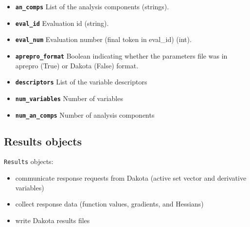 \begin{itemize}

  \item{} \label{index:dakota.interfacing.Parameters.an_comps}\textbf{\texttt{an\_comps}} List of the analysis components (strings).

  \item{} \label{index:dakota.interfacing.Parameters.eval_id}\textbf{\texttt{eval\_id}} Evaluation id (string).

  \item{} \label{index:dakota.interfacing.Parameters.eval_num}\textbf{\texttt{eval\_num}} Evaluation number (final token in eval\_id) (int).


  \item{} \label{index:dakota.interfacing.Parameters.aprepro_format}\textbf{\texttt{aprepro\_format}} Boolean indicating whether the parameters file was in aprepro (True) or Dakota (False) format.

  \item{}\label{index:dakota.interfacing.Parameters.descriptors}\textbf{\texttt{descriptors}} List of the variable descriptors

  \item{} \label{index:dakota.interfacing.Parameters.num_variables}\textbf{\texttt{num\_variables}} Number of variables

  \item{}\label{index:dakota.interfacing.Parameters.num_an_comps}\textbf{\texttt{num\_an\_comps}} Number of analysis components

\end{itemize}

\subsection{Results objects}

{\tt Results} objects:
\begin{itemize}

  \item communicate response requests from Dakota (active set vector and derivative variables)
  \item collect response data (function values, gradients, and Hessians)
  \item write Dakota results files
\end{itemize}

